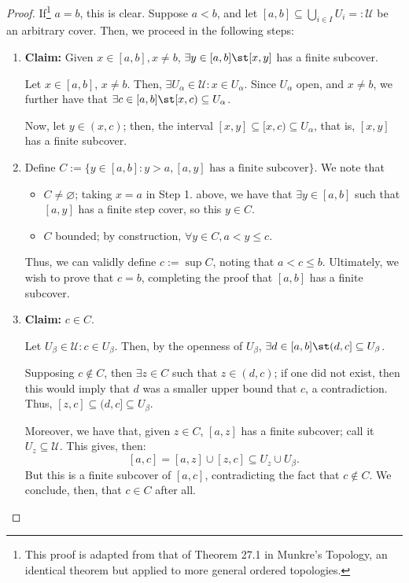 \begin{proof}
    If\footnote{This proof is adapted from that of Theorem 27.1 in Munkre's Topology, an identical theorem but applied to more general ordered topologies.} $a = b$, this is clear. Suppose $a < b$, and let $[a, b] \subseteq \bigcup_{i \in I} U_i =: \mathcal{U}$ be an arbitrary cover. Then, we proceed in the following steps:
    \begin{enumerate}
        \item \textbf{Claim:} Given $x \in [a, b], x \neq b$, $\exists y\in [a, b] \st [x, y]$ has a finite subcover.
        
        Let $x \in [a, b]$, $x \neq b$. Then, $\exists U_\alpha \in \mathcal{U} : x \in U_\alpha$. Since $U_\alpha$ open, and $x \neq b$, we further have that $\exists c \in [a, b] \st [x, c) \subseteq U_\alpha$. 

        Now, let $y \in (x, c)$; then, the interval $[x, y] \subseteq [x, c) \subseteq U_\alpha$, that is, $[x, y]$ has a finite subcover.

        \item Define $C := \{y \in [a, b]: y > a, [a, y] \text{ has a finite subcover}\}$. We note that 
        \begin{itemize}
            \item $C \neq \varnothing$; taking $x = a$ in Step 1. above, we have that $\exists y \in [a, b]$ such that $[a, y]$ has a finite step cover, so this $y \in C$.
            \item $C$ bounded; by construction, $\forall y \in C, a < y \leq c$.
        \end{itemize}
        Thus, we can validly define $c:= \sup C$, noting that $a < c \leq b$. Ultimately, we wish to prove that $c = b$, completing the proof that $[a, b]$ has a finite subcover.

        \item \textbf{Claim:} $c \in C$.
 
        Let $U_\beta \in \mathcal{U} : c \in U_\beta$. Then, by the openness of $U_\beta$, $\exists d \in [a, b] \st (d, c] \subseteq U_\beta$.

        Supposing $c \notin C$, then $\exists z \in C$ such that $z \in (d, c)$; if one did not exist, then this would imply that $d$ was a smaller upper bound that $c$, a contradiction. Thus, $[z , c] \subseteq (d, c] \subseteq U_\beta$.

        Moreover, we have that, given $z \in C$, $[a, z]$ has a finite subcover; call it $U_z \subseteq \mathcal{U}$. This gives, then: \[
        [a, c] = [a, z] \cup [z, c]  \subseteq U_z \cup U_\beta.
        \]
        But this is a finite subcover of $[a, c]$, contradicting the fact that $c \notin C$. We conclude, then, that $c \in C$ after all.


\end{enumerate}
\end{proof}
